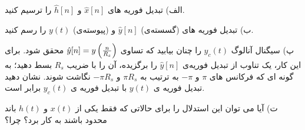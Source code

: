 \documentclass[10pt,letterpaper]{article}
\newcommand{\nl}{\newline\newline}
\newcounter{QuestionNumber}
\newcommand{\Q}{
\textbf{
سوال \theQuestionNumber)
}
\stepcounter{QuestionNumber}
}
\begin{document}
الف) تبدیل فوریه های $\hat x[n]$ و $\hat h[n]$ را ترسیم کنید.

ب) تبدیل فوریه های (گسسته‌ی)
$
\hat y[n]
$
 و (پیوسته‌ی) $y(t)$ را رسم کنید.

پ) سیگنال آنالوگ $y_c(t)$ را چنان بیابید که تساوی $
\hat y[n]=y\left({n\over R_s}\right)
$ محقق شود. برای این کار، یک تناوب از تبدیل فوریه‌ی 
$
\hat y[n]
$
 را برگزیده، آن را با ضریب $R_s$  بسط دهید؛ به گونه ای که فرکانس های $\pi$ و $-\pi$ به ترتیب به 
$
\pi R_s
$
 و 
$
-\pi R_s
$
نگاشت شوند. نشان دهید تبدیل فوریه ی $y(t)$ با تبدیل فوریه ی  $y_c(t)$ برابر است.

ت) آیا می توان این استدلال را برای حالاتی که فقط یکی از $x(t)$ و $h(t)$ باند محدود باشند به کار برد؟ چرا؟
\end{document}
